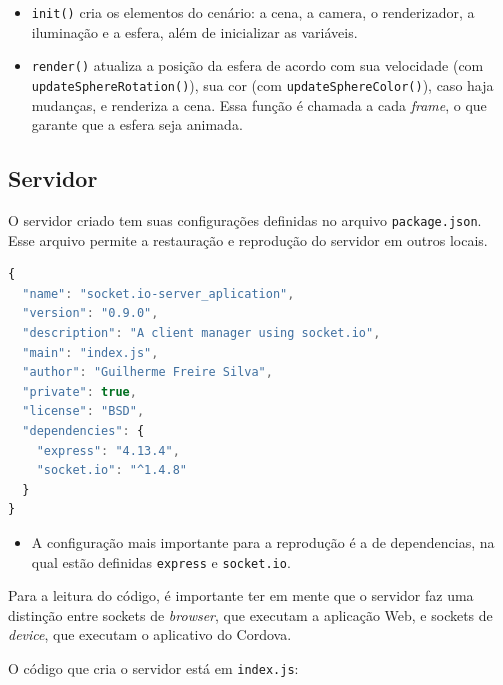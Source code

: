 \documentclass[a4paper,12pt]{article}
\newcommand{\code}[1]{\lstinline[mathescape=true, columns=fixed, basicstyle={\small\ttfamily}]{#1}}
\begin{document}
\begin{itemize}
  \item \code{init()} cria os elementos do cenário: a cena, a camera, o renderizador, a iluminação e a esfera, além de inicializar as variáveis.

  \item \code{render()} atualiza a posição da esfera de acordo com sua velocidade (com \code{updateSphereRotation()}), sua cor (com \code{updateSphereColor()}), caso haja mudanças, e renderiza a cena. Essa função é chamada a cada \emph{frame}, o que garante que a esfera seja animada.
\end{itemize}



\newpage
\subsection{Servidor}

O servidor criado tem suas configurações definidas no arquivo \code{package.json}. Esse arquivo permite a restauração e reprodução do servidor em outros locais.


\begin{lstlisting}[language=JavaScript]
{
  "name": "socket.io-server_aplication",
  "version": "0.9.0",
  "description": "A client manager using socket.io",
  "main": "index.js",
  "author": "Guilherme Freire Silva",
  "private": true,
  "license": "BSD",
  "dependencies": {
    "express": "4.13.4",
    "socket.io": "^1.4.8"
  }
}

\end{lstlisting}

\begin{itemize}
  \item A configuração mais importante para a reprodução é a de dependencias, na qual estão definidas \code{express} e \code{socket.io}.
\end{itemize}

Para a leitura do código, é importante ter em mente que o servidor faz uma distinção entre sockets de \emph{browser}, que executam a aplicação Web, e sockets de \emph{device}, que executam o aplicativo do Cordova.

O código que cria o servidor está em \code{index.js}:
\end{document}
